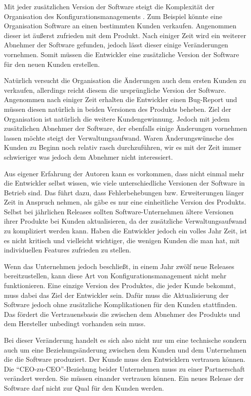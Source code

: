Mit jeder zusätzlichen Version der Software steigt die Komplexität der Organisation des Konfigurationsmanagements \cite{dpunktkonfig2008}. Zum Beispiel könnte eine Organisation Software an einen bestimmten Kunden verkaufen. Angenommen dieser ist äußerst zufrieden mit dem Produkt. Nach einiger Zeit wird ein weiterer Abnehmer der Software gefunden, jedoch lässt dieser einige Veränderungen vornehmen. Somit müssen die Entwickler eine zusätzliche Version der Software für den neuen Kunden erstellen. 

Natürlich versucht die Organisation die Änderungen auch dem ersten Kunden zu verkaufen, allerdings reicht diesem die ursprüngliche Version der Software. Angenommen nach einiger Zeit erhalten die Entwickler einen Bug-Report und müssen diesen natürlich in beiden Versionen des Produkts beheben. Ziel der Organisation ist natürlich die weitere Kundengewinnung. Jedoch mit jedem zusätzlichen Abnehmer der Software, der ebenfalls einige Änderungen vornehmen lassen möchte steigt der Verwaltungsaufwand. Waren Änderungswünsche des Kunden zu Beginn noch relativ rasch durchzuführen, wir es mit der Zeit immer schwieriger was jedoch dem Abnehmer nicht interessiert.

Aus eigener Erfahrung der Autoren kann es vorkommen, dass nicht einmal mehr die Entwickler selbst wissen, wie viele unterschiedliche Versionen der Software in Betrieb sind. Das führt dazu, dass Fehlerbehebungen bzw. Erweiterungen länger Zeit in Anspruch nehmen, als gäbe es nur eine einheitliche Version des Produkts. Selbst bei jährlichen Releases sollten Software-Unternehmen ältere Versionen ihrer Produkte bei Kunden aktualisieren, da der zusätzliche Verwaltungsaufwand zu kompliziert werden kann. Haben die Entwickler jedoch ein volles Jahr Zeit, ist es nicht kritisch und vielleicht wichtiger, die wenigen Kunden die man hat, mit individuellen Features zufrieden zu stellen.

Wenn das Unternehmen jedoch beschließt, in einem Jahr zwölf neue Releases bereitzustellen, kann diese Art von Konfigurationsmanagement nicht mehr funktionieren. Eine einzige Version des Produktes, die jeder Kunde bekommt, muss dabei das Ziel der Entwickler sein. Dafür muss die Aktualisierung der Software jedoch ohne zusätzliche Komplikationen für den Kunden stattfinden. Das fördert die Vertrauensbasis die zwischen dem Abnehmer des Produkts und dem Hersteller unbedingt vorhanden sein muss.

Bei dieser Veränderung handelt es sich also nicht nur um eine technische sondern auch um eine Beziehungsänderung zwischen dem Kunden und dem Unternehmen die die Software produziert. Der Kunde muss den Entwicklern vertrauen können. Die \enquote{CEO-zu-CEO}-Beziehung beider Unternehmen muss zu einer Partnerschaft verändert werden. Sie müssen einander vertrauen können. Ein neues Release der Software darf nicht zur Qual für den Kunden werden. 

